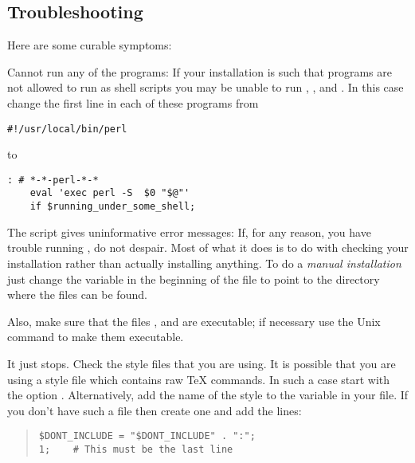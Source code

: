 \subsection{Troubleshooting}%
%
Here are some curable symptoms:

\begin{htmllist}
\item [Cannot run any of the \Perl{} programs: ]
If your \Perl{} installation is such that \Perl{} programs are not allowed 
to run as shell scripts you may be unable to run  
, ,  and  . 
In this case change the first line in each of these
programs from
\begin{small}
\begin{verbatim}
#!/usr/local/bin/perl
\end{verbatim}
\end{small}%
to
\begin{small}%
\begin{verbatim}
: # *-*-perl-*-*
    eval 'exec perl -S  $0 "$@"'
    if $running_under_some_shell; 
\end{verbatim}
\end{small}

\item [The \fn{install-test} script gives uninformative error messages: ]
If, for any reason, you have trouble running ,
do not despair. Most of what it does is to do with checking
your installation rather than actually installing anything.
To do a \textit{manual installation} just change the variable
 in the beginning of the file 
to point to the directory where the \latextohtml{} files can be found.

Also, make sure that the files
,  and  are executable;
if necessary use the Unix  command to make them 
executable.

\item [It just stops. ] Check the style
files that you are using. It is possible that you are using
a style file which contains raw \TeX{} commands. In such a case
start \latextohtml{} with the option 
. 
Alternatively, add the name of the style to the variable 
 in your
 file. If you don't have such a file then
create one and add the lines:
\begin{quote}
\begin{small}
\verb|$DONT_INCLUDE = "$DONT_INCLUDE" . ":|\verb|";|\\
\verb|1; 	# This must be the last line|
\end{small}
\end{quote}


\end{htmllist}
